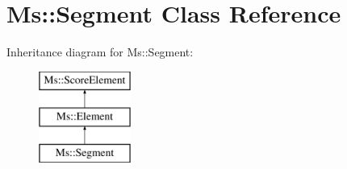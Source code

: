 \hypertarget{class_ms_1_1_segment}{}\section{Ms\+:\+:Segment Class Reference}
\label{class_ms_1_1_segment}
Inheritance diagram for Ms\+:\+:Segment\+:\begin{figure}[H]
\begin{center}
\leavevmode
\includegraphics[height=3.000000cm]{class_ms_1_1_segment}
\end{center}
\end{figure}

